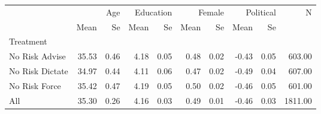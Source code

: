 \begin{tabular}{lrrrrrrrrr}
 & \multicolumn{2}{r}{Age} & \multicolumn{2}{r}{Education} & \multicolumn{2}{r}{Female} & \multicolumn{2}{r}{Political} & N \\
 & Mean & Se & Mean & Se & Mean & Se & Mean & Se &  \\
Treatment &  &  &  &  &  &  &  &  &  \\
No Risk Advise & 35.53 & 0.46 & 4.18 & 0.05 & 0.48 & 0.02 & -0.43 & 0.05 & 603.00 \\
No Risk Dictate & 34.97 & 0.44 & 4.11 & 0.06 & 0.47 & 0.02 & -0.49 & 0.04 & 607.00 \\
No Risk Force & 35.42 & 0.47 & 4.19 & 0.05 & 0.50 & 0.02 & -0.46 & 0.05 & 601.00 \\
All & 35.30 & 0.26 & 4.16 & 0.03 & 0.49 & 0.01 & -0.46 & 0.03 & 1811.00 \\
\end{tabular}
